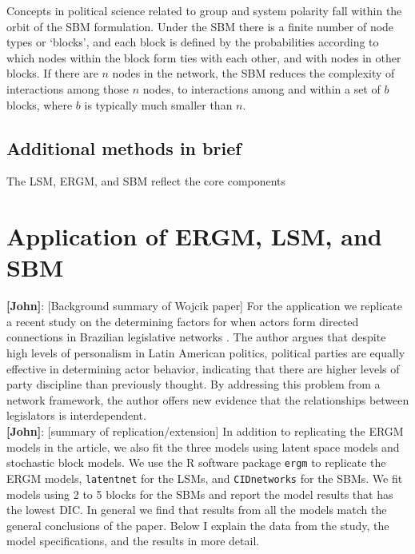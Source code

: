 \documentclass[fleqn,12pt]{wlscirep}
\begin{document}
Concepts in political science related to group  and system polarity \citep[e.g., ][]{baldassarri2007dynamics,cranmer2015kantian} fall within the orbit of the SBM formulation. Under the SBM there is a finite number of node types or `blocks', and each block is defined by the probabilities according to which nodes within the block form ties with each other, and with nodes in other blocks. If there are $n$ nodes in the network, the SBM reduces the complexity of interactions among those $n$  nodes, to interactions among and within a set of $b$ blocks, where $b$ is typically much smaller than $n$. 

\subsection{Additional methods in brief}

The LSM, ERGM, and SBM reflect the core components

\section{Application of ERGM, LSM, and SBM}

{\bf [John]}: [Background summary of Wojcik paper] For the application we replicate a recent study on the determining factors for when actors form directed connections in Brazilian legislative networks \citep{wojcik2017legislative}. The author argues that despite high levels of personalism in Latin American politics, political parties are equally effective in determining actor behavior, indicating that there are higher levels of party discipline than previously thought. By addressing this problem from a network framework, the author offers new evidence that the relationships between legislators is interdependent.\\

{\bf [John]}: [summary of replication/extension] In addition to replicating the ERGM models in the article, we also fit the three models using latent space models and stochastic block models. We use the R software package \texttt{ergm} to replicate the ERGM models, \texttt{latentnet} for the LSMs, and \texttt{CIDnetworks} for the SBMs.  We fit models using 2 to 5 blocks for the SBMs and report the model results that has the lowest DIC. In general we find that results from all the models match the general conclusions of the paper. Below I explain the data from the study, the model specifications, and the results in more detail.
\end{document}
